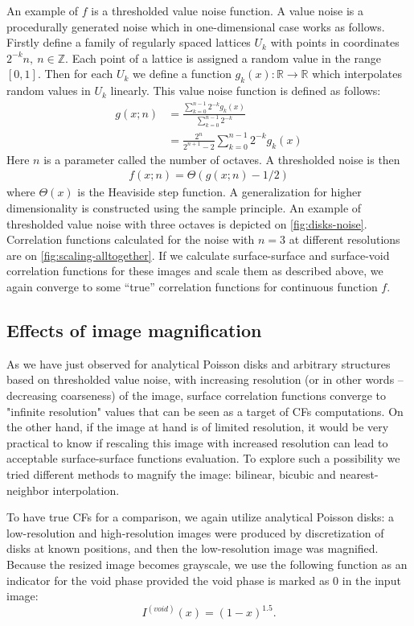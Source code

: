 \documentclass[reprint,amsmath,amssymb,aps,pre,showkeys,showpacs]{revtex4-1}
\begin{document}
An example of $f$ is a thresholded value noise function. A value noise is a
procedurally generated noise which in one-dimensional case works as
follows. Firstly define a family of regularly spaced lattices $U_k$ with points
in coordinates $2^{-k}n,\ n \in \mathbb{Z}$. Each point of a lattice is assigned
a random value in the range $[0, 1]$. Then for each $U_k$ we define a
function $g_k(x): \mathbb{R} \rightarrow \mathbb{R}$ which interpolates random
values in $U_k$ linearly. This value noise function is defined as follows:
\begin{align*}
  g(x; n) &= \frac{\sum\limits_{k=0}^{n-1} 2^{-k}g_k(x)}{\sum\limits_{k=0}^{n-1}
    2^{-k}} \\
  &= \frac{2^n}{2^{n+1}-2} \sum\limits_{k=0}^{n-1} 2^{-k}g_k(x)
\end{align*}
Here $n$ is a parameter called the number of octaves. A thresholded noise is then
\begin{align*}
  f(x; n) = \Theta(g(x; n) - 1/2)
\end{align*}
where $\Theta(x)$ is the Heaviside step function. A generalization for higher
dimensionality is constructed using the sample principle. An example of
thresholded value noise with three octaves is depicted on
\cref{fig:disks-noise}. Correlation functions calculated for the noise with
$n = 3$ at different resolutions are on \cref{fig:scaling-alltogether}. If we
calculate surface-surface and surface-void correlation functions for these
images and scale them as described above, we again converge to some ``true''
correlation functions for continuous function $f$.

\subsection{Effects of image magnification}
\label{sec:magnify}
As we have just observed for analytical Poisson disks and arbitrary structures
based on thresholded value noise, with increasing resolution (or in other words
-- decreasing coarseness) of the image, surface correlation functions converge
to "infinite resolution" values that can be seen as a target of CFs
computations. On the other hand, if the image at hand is of limited
resolution, it would be very practical to know if rescaling this image with
increased resolution can lead to acceptable surface-surface functions
evaluation. To explore such a possibility we tried different methods to magnify
the image: bilinear, bicubic and nearest-neighbor interpolation.

To have true CFs for a comparison, we again utilize analytical Poisson disks: a
low-resolution and high-resolution images were produced by discretization of
disks at known positions, and then the low-resolution image was
magnified. Because the resized image becomes grayscale, we use the following
function as an indicator for the void phase provided the void phase is marked as
0 in the input image:
\begin{equation*}
  I^{(void)}(x) = (1 - x)^{1.5}.
\end{equation*}
\end{document}
